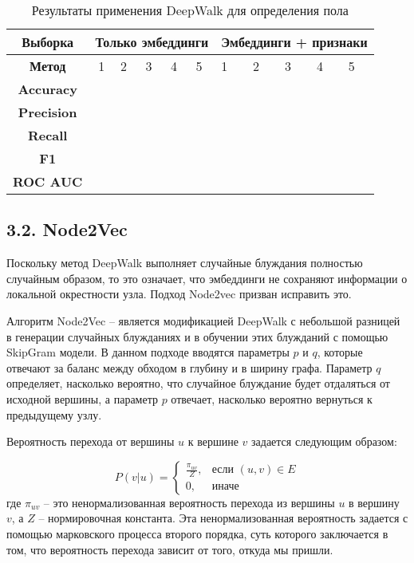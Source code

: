\begin{table}[h!]
\centering
\begin{tabular}{|c|c|l|l|l|l|l|l|l|l|l|}
\hline
\textbf{Выборка}   & \multicolumn{5}{c|}{Только эмбеддинги} & \multicolumn{5}{l|}{Эмбеддинги + признаки} \\ \hline
\textbf{Метод}     & 1                      & 2 & 3 & 4 & 5 & 1      & 2      & 3      & 4      & 5      \\ \hline
\textbf{Accuracy}  &                        &   &   &   &   &        &        &        &        &        \\ \hline
\textbf{Precision} &                        &   &   &   &   &        &        &        &        &        \\ \hline
\textbf{Recall}    &                        &   &   &   &   &        &        &        &        &        \\ \hline
\textbf{F1}        &                        &   &   &   &   &        &        &        &        &        \\ \hline
\textbf{ROC AUC}   & \multicolumn{1}{l|}{}  &   &   &   &   &        &        &        &        &        \\ \hline
\end{tabular}
\caption{Результаты применения DeepWalk для определения пола}
\label{DeepWalk gender table}
\end{table}


\subsection{3.2. Node2Vec}

Поскольку метод DeepWalk выполняет случайные блуждания полностью случайным образом, то это означает, что эмбеддинги не сохраняют информации о локальной окрестности узла. Подход Node2vec призван исправить это.

Алгоритм Node2Vec \cite{Node2Vec} -- является модификацией DeepWalk с небольшой разницей в генерации случайных блужданиях и в обучении этих блужданий с помощью SkipGram модели. В данном подходе вводятся параметры $p$ и $q$, которые отвечают за баланс между обходом в глубину и в ширину графа. Параметр $q$ определяет, насколько вероятно, что случайное блуждание будет отдаляться от исходной вершины, а параметр $p$ отвечает, насколько вероятно вернуться к предыдущему узлу.

Вероятность перехода от вершины $u$ к вершине $v$ задается следующим образом: 

$$ P(v|u) =
\begin{cases}
\frac{\pi_{uv}}{Z}, & \text{если } (u, v) \in E \\
0, & \text{иначе}
\end{cases}
$$
где $\pi_{uv}$ -- это ненормализованная вероятность перехода из вершины $u$ в вершину $v$, а $Z$ -- нормировочная константа. Эта ненормализованная вероятность задается с помощью марковского процесса второго порядка, суть которого заключается в том, что вероятность перехода зависит от того, откуда мы пришли.

